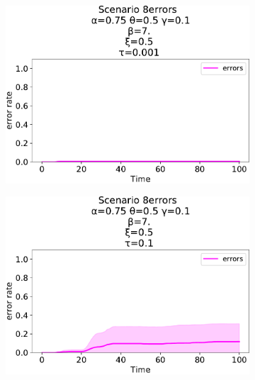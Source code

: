 \begin{figure}[!ht]
\begin{subfigure}[b]{0.32\textwidth}
    \includegraphics[width=\textwidth]{papers/swarm-intelligence2021/img/simulations/failScenario_0_08_α-0.75_θ-0.5_γ-0.1_β-7._ω-0._ζ-0._ξ-0.5_τ-0.001}
  \end{subfigure}
  \hfill
  \begin{subfigure}[b]{0.32\textwidth}
    \centering
    \includegraphics[width=\textwidth]{papers/swarm-intelligence2021/img/simulations/failScenario_0_08_α-0.75_θ-0.5_γ-0.1_β-7._ω-0._ζ-0._ξ-0.5_τ-0.1}
  \end{subfigure}
  \hfill
  \begin{subfigure}[b]{0.32\textwidth}
    \centering

\end{subfigure}
\end{figure}
